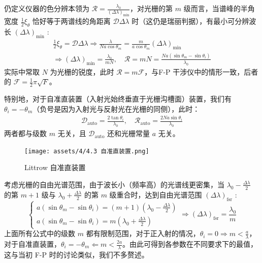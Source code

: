 \documentclass[UTF8]{report}
\theoremstyle{MyLineTheoremStyle} %
\theoremstyle{MyBlockTheoremStyle} %
\theoremstyle{MySubsubsectionStyle} %
\begin{document}
仍定义仪器的色分辨本领为 $\mathscr{R} = \frac{\lambda_0}{\left(\Delta \lambda\right)_{\min}}$，对光栅的第 $m$ 级而言，当谱峰的半角宽度 $\frac{1}{2}\xi_\theta$ 恰好等于两谱线的角距离 $\mathscr{D} \Delta \lambda$ 时（这仍是瑞丽判据），有最小可分辨波长 $\left(\Delta \lambda\right)_{\min}$ : 
\begin{gather}
    \frac{1}{2}\xi_\theta = \mathscr{D} \Delta \lambda 
    \Longrightarrow \frac{\lambda}{Na \cos \theta_m} = \frac{m}{a \cos \theta_m} \left(\Delta \lambda\right)_{\min} 
    \\ \Longrightarrow 
    \left(\Delta \lambda\right)_{\min} = \frac{\lambda_0}{mN},\quad \mathscr{R} = mN = \frac{Na \left(\sin \theta_m - \sin \theta_i \right)}{\lambda_0}
\end{gather}
实际中常取 $N$ 为光栅的锐度，此时 $\mathscr{R} = m \mathscr{F}$，与F-P 干涉仪中的情形一致，后者的 $\mathscr{F} = \frac{1}{2}\pi \sqrt{F}$。

特别地，对于自准直装置（入射光始终垂直于光栅沟槽面）装置，我们有 $\theta_i = -\theta_m$（负号是因为入射光与反射光在光栅的同侧），此时：
\begin{gather}
    \mathscr{D}_{\text{auto}} = \frac{2 \tan \theta_i}{\lambda_0} ,\quad 
    \mathscr{R}_{\text{auto}} = \frac{2Na \sin \theta_i }{\lambda_0} 
\end{gather}
两者都与级数 $m$ 无关，且 $\mathscr{D}_{\text{auto}}$ 还和光栅常量 $a$ 无关。
\begin{figure}[H]\centering
    \texttt{[image: assets/4/4.3 自准直装置.png]}
    \caption{Littrow 自准直装置}\label{自准直装置}
\end{figure}


考虑光栅的自由光谱范围，由于波长小（频率高）的光谱线更密集，当 $\lambda_0 - \frac{\Delta \lambda}{2}$ 的第 $m+1$ 级与 $\lambda_0 + \frac{\Delta \lambda}{2}$ 的第 $m$ 级重合时，达到自由光谱范围 $\left(\Delta \lambda\right)_{\text{fsr}}$ :
\begin{equation}
\begin{cases}
    a(\sin \theta_m - \sin \theta_i ) = (m+1)\left(\lambda_0 - \frac{\Delta \lambda}{2}\right) \\ 
    a(\sin \theta_m - \sin \theta_i ) = m\left(\lambda_0 + \frac{\Delta \lambda}{2}\right)
\end{cases}
\Longrightarrow 
\left(\Delta \lambda\right)_{\text{fsr}} = \frac{\lambda_0}{m}
\end{equation}
上面所有公式中的级数 $m$ 都有限制范围，对于正入射的情况，$\theta_i = 0 \Longrightarrow m < \frac{a}{\lambda}$，对于自准直装置，$\theta_i = -\theta_m \Longleftarrow m < \frac{2a}{\lambda}$。由此可得到各参数在不同要求下的最值，这与当初 F-P 时的讨论类似，我们不多赘述。
\end{document}
